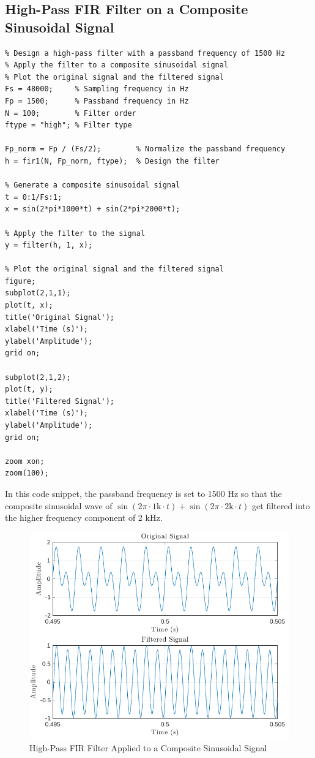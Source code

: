 \documentclass{zc-ust-hw}
\begin{document}
\newpage

\subsection{High-Pass FIR Filter on a Composite Sinusoidal Signal}
    
\begin{verbatim}
% Design a high-pass filter with a passband frequency of 1500 Hz
% Apply the filter to a composite sinusoidal signal
% Plot the original signal and the filtered signal
Fs = 48000;     % Sampling frequency in Hz
Fp = 1500;      % Passband frequency in Hz
N = 100;        % Filter order
ftype = "high"; % Filter type

Fp_norm = Fp / (Fs/2);        % Normalize the passband frequency
h = fir1(N, Fp_norm, ftype);  % Design the filter

% Generate a composite sinusoidal signal
t = 0:1/Fs:1;
x = sin(2*pi*1000*t) + sin(2*pi*2000*t);

% Apply the filter to the signal
y = filter(h, 1, x);

% Plot the original signal and the filtered signal
figure;
subplot(2,1,1);
plot(t, x);
title('Original Signal');
xlabel('Time (s)');
ylabel('Amplitude');
grid on;

subplot(2,1,2);
plot(t, y);
title('Filtered Signal');
xlabel('Time (s)');
ylabel('Amplitude');
grid on;

zoom xon;
zoom(100);
\end{verbatim}

In this code snippet, the passband frequency is set to 1500 Hz so that the
composite sinusoidal wave of \( \sin (2\pi \cdot 1\text{k} \cdot t) + \sin
(2\pi \cdot 2\text{k} \cdot t) \) get filtered into the higher frequency
component of 2 kHz.

\begin{figure}[p]
  \begin{center}
    \includegraphics[width=\textwidth]{figures/high-pass-fir-filter-on-sin-wave.pdf}
  \end{center}
  \caption{High-Pass FIR Filter Applied to a Composite Sinusoidal Signal}
\end{figure}
\end{document}
